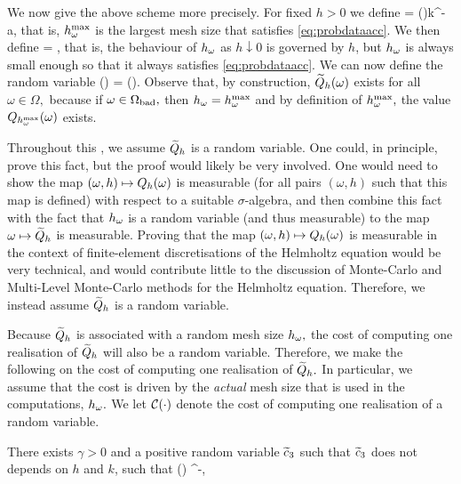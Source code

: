 We now give the above scheme more precisely. For fixed $h>0$ we define
\beq\label{eq:hmaxomega}
\hmaxomega = \Co(\omega)k^{-a},
\eeq
that is, $h^{\max}_{\omega}$ is the largest mesh size that satisfies \cref{eq:probdataacc}. We then define
\beq\label{eq:homega}
\homega = \min{},
\eeq
that is, the behaviour of $h_{\omega}$ as $h\downarrow 0$ is governed by $h$, but $h_{\omega}$ is always small enough so that it always satisfies \cref{eq:probdataacc}. We can now define the random variable
\beq\label{eq:Qhtilde}
\Qhtilde(\omega) = \Qhomega(\omega).
\eeq
Observe that, by construction, $\widetilde{Q}_{h}(\omega)$ exists for all $\omega \in \Omega,$ because if $\omega \in \Omega_{\mathrm{bad}},$ then $h_{\omega} = h^{\max}_{\omega}$ and by definition of $h^{\max}_{\omega},$ the value $Q_{h^{\max}_{\omega}}(\omega)$ exists.

\label{rem:Qhtilderandom}
Throughout this , we assume $\widetilde{Q}_{h}$ is a random variable. One could, in principle, prove this fact, but the proof would likely be very involved. One would need to show the map $(\omega,h) \mapsto Q_{h}(\omega)$ is measurable (for all pairs $(\omega,h)$ such that this map is defined) with respect to a suitable $\sigma$-algebra, and then combine this fact with the fact that $h_{\omega}$ is a random variable (and thus measurable) to the map $\omega \mapsto \widetilde{Q}_{h}$ is measurable. Proving that the map $(\omega,h) \mapsto Q_{h}(\omega)$ is measurable in the context of finite-element discretisations of the Helmholtz equation would be very technical, and would contribute little to the discussion of Monte-Carlo and Multi-Level Monte-Carlo methods for the Helmholtz equation. Therefore, we instead assume $\widetilde{Q}_{h}$ is a random variable.
\ere

Because $\widetilde{Q}_{h}$ is associated with a random mesh size $h_{\omega},$ the cost of computing one realisation of $\widetilde{Q}_{h}$ will also be a random variable. Therefore, we make the following  on the cost of computing one realisation of $\widetilde{Q}_{h}.$ In particular, we assume that the cost is driven by the \emph{actual} mesh size that is used in the computations, $h_{\omega}.$ We let $\Cost{\cdot}$ denote the cost of computing one realisation of a random variable.

\label{ass:costone}
There exists $ \gamma > 0$ and a positive random variable $\widetilde{c}_{3}$ such that $\widetilde{c}_{3}$ does not depends on $h$ and $k$, such that
\beqs
\Cost{\Qhtilde(\omega)} \leq \cthtilde(\omega) \homega^{-\gamma},
\eeqs
\eas

